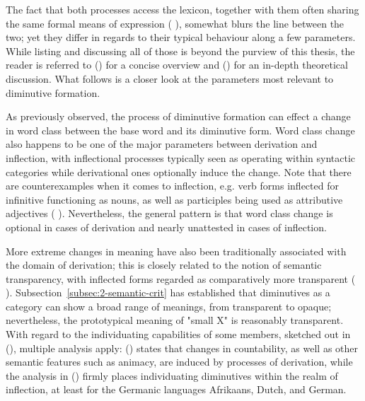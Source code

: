 The fact that both processes access the lexicon, together with them often sharing the same formal means of expression (\citeauthor{Booij+2000} \citeyear{Booij+2000}), somewhat blurs the line between the two; yet they differ in regards to their typical behaviour along a few parameters. While listing and discussing all of those is beyond the purview of this thesis, the reader is referred to \citeauthor{Booij+2000} (\citeyear{Booij+2000}) for a concise overview and \citeauthor{Scalise+1986} (\citeyear{Scalise+1986}) for an in-depth theoretical discussion. What follows is a closer look at the parameters most relevant to diminutive formation.

 As previously observed, the process of diminutive formation can effect a change in word class between the base word and its diminutive form. Word class change also happens to be one of the major parameters between derivation and inflection, with inflectional processes typically seen as operating within syntactic categories while derivational ones optionally induce the change. Note that there are counterexamples when it comes to inflection, e.g. verb forms inflected for infinitive functioning as nouns, as well as participles being used as attributive adjectives (\citeauthor{Booij+2000} \citeyear{Booij+2000}). Nevertheless, the general pattern is that word class change is optional in cases of derivation and nearly unattested in cases of inflection.

 More extreme changes in meaning have also been traditionally associated with the domain of derivation; this is closely related to the notion of semantic transparency, with inflected forms regarded as comparatively more transparent (\citeauthor{Booij+2000} \citeyear{Booij+2000}). Subsection~\ref{subsec:2-semantic-crit} has established that diminutives as a category can show a broad range of meanings, from transparent to opaque; nevertheless, the prototypical meaning of "small X" is reasonably transparent. With regard to the individuating capabilities of some members, sketched out in \citeauthor{Wiltschko+2006} (\citeyear{Wiltschko+2006}), multiple analysis apply: \citeauthor{Scalise+1986} (\citeyear{Scalise+1986}) states that changes in countability, as well as other semantic features such as animacy, are induced by processes of derivation, while the analysis in \citeauthor{DeBelder+2011a} (\citeyear{DeBelder+2011a}) firmly places individuating diminutives within the realm of inflection, at least for the Germanic languages Afrikaans, Dutch, and German. 

